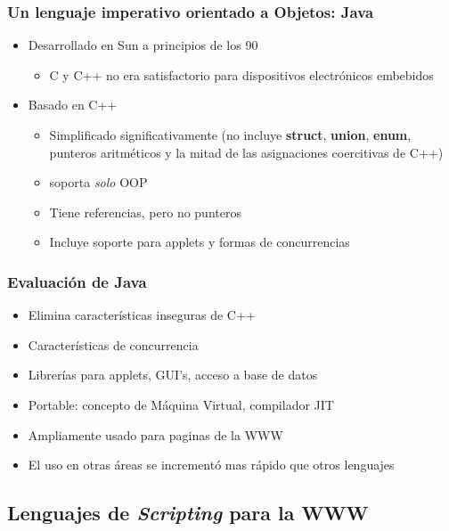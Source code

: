 \documentclass[11pt]{article}
\begin{document}
\subsubsection*{Un lenguaje imperativo orientado a Objetos: Java}
\label{sec:orgheadline98}
\begin{itemize}
\item Desarrollado en Sun a principios de los 90
\begin{itemize}
\item C y C++ no era satisfactorio para dispositivos electrónicos embebidos
\end{itemize}
\item Basado en C++
\begin{itemize}
\item Simplificado significativamente (no incluye \textbf{struct}, \textbf{union},
\textbf{enum}, punteros aritméticos y la mitad de las asignaciones
coercitivas de C++)
\item soporta \emph{solo} OOP
\item Tiene referencias, pero no punteros
\item Incluye soporte para applets y formas de concurrencias
\end{itemize}
\end{itemize}

\subsubsection*{Evaluación de Java}
\label{sec:orgheadline99}
\begin{itemize}
\item Elimina características inseguras de C++
\item Características de concurrencia
\item Librerías para applets, GUI's, acceso a base de datos
\item Portable: concepto de Máquina Virtual, compilador JIT
\item Ampliamente usado para paginas de la WWW
\item El uso en otras áreas se incrementó mas rápido que otros lenguajes
\end{itemize}

\subsection*{Lenguajes de \emph{Scripting} para la WWW}
\label{sec:orgheadline102}
\end{document}
